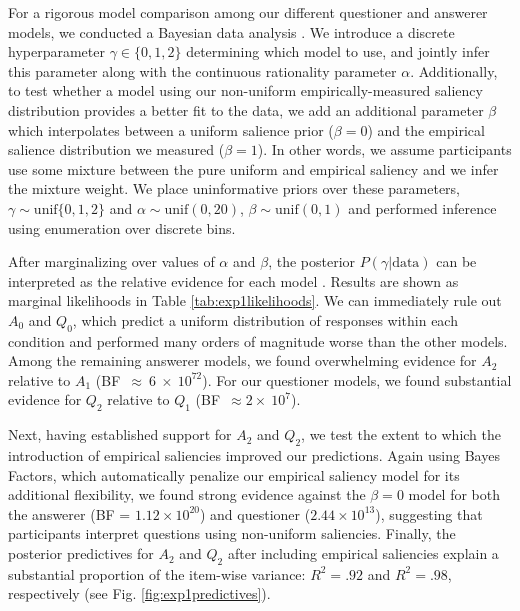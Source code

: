 \documentclass[11pt, floatsintext]{apa6}
\newcommand{\ndg}[1]{\textcolor{Green}{[ndg: #1]}}
\begin{document}
For a rigorous model comparison among our different questioner and answerer models, we conducted a Bayesian data analysis \cite{LeeWagenmakers14_BDA}. 
We introduce a discrete hyperparameter $\gamma \in \{0, 1, 2\}$  determining which model to use, and jointly infer this parameter along with the continuous rationality parameter $\alpha$.
Additionally, to test whether a model using our non-uniform empirically-measured saliency distribution provides a better fit to the data, we add an additional parameter $\beta$ which interpolates between a uniform salience prior ($\beta = 0$) and the empirical salience distribution we measured ($\beta = 1$). 
In other words, we assume participants use some mixture between the pure uniform and empirical saliency and we infer the mixture weight.
We place uninformative priors over these parameters,
$\gamma \sim  \textrm{unif}\{0, 1, 2\}$ and 
$\alpha   \sim  \textrm{unif}(0,20)$, 
$\beta \sim \textrm{unif}(0, 1)$
and performed inference using enumeration over discrete bins. 

After marginalizing over values of $\alpha$ and $\beta$, the posterior $P(\gamma | \textrm{data})$ can be interpreted as the relative evidence for each model \cite{KruschkeVanPaemel15_OxfordHandbook}.
Results are shown as marginal likelihoods in Table \ref{tab:exp1likelihoods}. 
We can immediately rule out $A_0$ and $Q_0$, which predict a uniform distribution of responses within each condition and performed many orders of magnitude worse than the other models.
Among the remaining answerer models, we found overwhelming evidence for $A_2$ relative to $A_1$ (BF~$\approx~6~\times~10^{72}$). 
For our questioner models, we found substantial evidence for $Q_2$ relative to $Q_1$ (BF~$\approx2\times~10^{7}$). 

Next, having established support for $A_2$ and $Q_2$, we test the extent to which the introduction of empirical saliencies improved our predictions. 
Again using Bayes Factors, which automatically penalize our empirical saliency model for its additional flexibility, we found strong evidence against the $\beta=0$ model for both the answerer (BF = $1.12\times 10^{20}$) and questioner ($2.44 \times 10^{13}$), suggesting that participants interpret questions using non-uniform saliencies.
Finally, the posterior predictives for $A_2$ and $Q_2$ after including empirical saliencies explain a substantial proportion of the item-wise variance: $R^2 = .92$ and $R^2 = .98$, respectively (see Fig. \ref{fig:exp1predictives}). %
\end{document}

